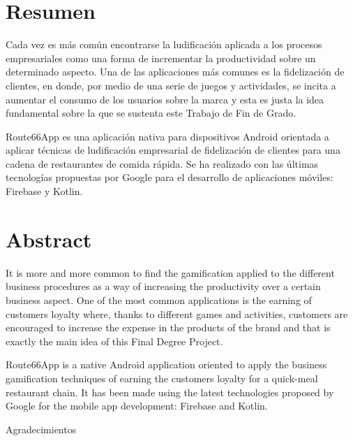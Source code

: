 \documentclass[twoside]{report}
\begin{document}
\newpage
\thispagestyle{empty}
\mbox{}

\clearpage


\section*{Resumen}

Cada vez es más común encontrarse la ludificación aplicada a los procesos empresariales como una forma de incrementar la productividad sobre un determinado aspecto. Una de las aplicaciones más comunes es la fidelización de clientes, en donde, por medio de una serie de juegos y actividades, se incita a aumentar el consumo de los usuarios sobre la marca y esta es justa la idea fundamental sobre la que se sustenta este Trabajo de Fin de Grado.

Route66App es una aplicación nativa para dispositivos Android orientada a aplicar técnicas de ludificación empresarial de fidelización de clientes para una cadena de restaurantes de comida rápida. Se ha realizado con las últimas tecnologías propuestas por Google para el desarrollo de aplicaciones móviles: Firebase y Kotlin.


\section*{Abstract}

It is more and more common to find the gamification applied to the different business procedures as a way of increasing the productivity over a certain business aspect. One of the most common applications is the earning of customers loyalty where, thanks to different games and activities, customers are encouraged to increase the expense in the products of the brand and that is exactly the main idea of this Final Degree Project.

Route66App is a native Android application oriented to apply the business gamification techniques of earning the customers loyalty for a quick-meal restaurant chain. It has been made using the latest technologies proposed by Google for the mobile app development: Firebase and Kotlin.

\clearpage


\hbox{}
\vspace{7cm}
\begin{huge}
Agradecimientos
\end{huge}
\end{document}
